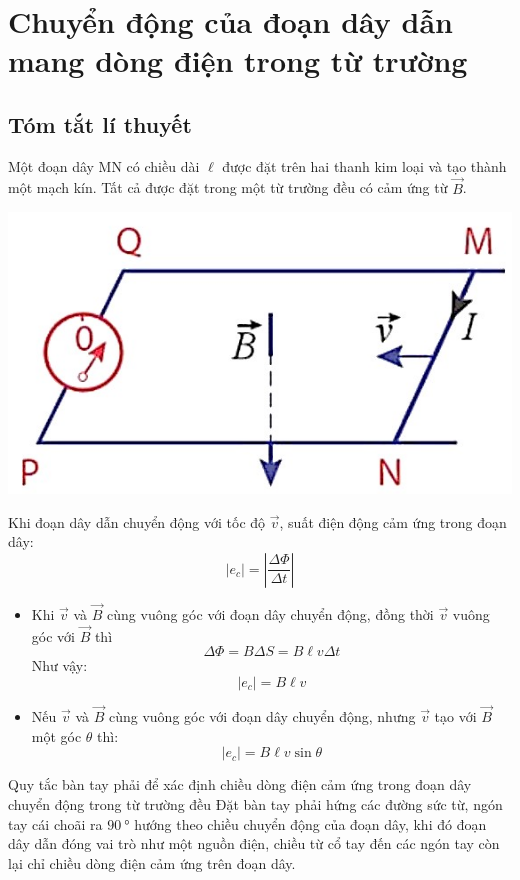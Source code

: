 \section{Chuyển động của đoạn dây dẫn mang dòng điện trong từ trường}
\subsection{Tóm tắt lí thuyết}
\begin{tomtat}
	Một đoạn dây MN có chiều dài $\ell$ được đặt trên hai thanh kim loại và tạo thành một mạch kín. Tất cả được đặt trong một từ trường đều có cảm ứng từ $\vec{B}$.
	\begin{center}
		\includegraphics[width=0.4\linewidth]{figs/VN12-Y24-PH-SYL-022-1}
	\end{center}
	Khi đoạn dây dẫn chuyển động với tốc độ $\vec{v}$, suất điện động cảm ứng trong đoạn dây:
	\begin{equation}
		\left|e_c\right|=\left|\dfrac{\Delta \Phi}{\Delta t}\right|
	\end{equation}
	\begin{itemize}
		\item Khi $\vec{v}$ và $\vec{B}$ cùng vuông góc với đoạn dây chuyển động, đồng thời $\vec{v}$ vuông góc với $\vec{B}$ thì
		$$\Delta \Phi=B\Delta S=B\ell v\Delta t$$
		Như vậy:
		\begin{equation}
			\left|e_c\right|=B\ell v
		\end{equation}
		\item Nếu $\vec{v}$ và $\vec{B}$ cùng vuông góc với đoạn dây chuyển động, nhưng $\vec{v}$ tạo với $\vec{B}$ một góc $\theta$ thì:
		\begin{equation}
			\left|e_c\right|=B\ell v\sin\theta
		\end{equation}
	\end{itemize}
	\begin{noidung}{Quy tắc bàn tay phải để xác định chiều dòng điện cảm ứng trong đoạn dây chuyển động trong từ trường đều}
		Đặt bàn tay phải hứng các đường sức từ, ngón tay cái choãi ra $\SI{90}{\degree}$ hướng theo chiều chuyển động của đoạn dây, khi đó đoạn dây dẫn đóng vai trò như một nguồn điện, chiều từ cổ tay đến các ngón tay còn lại chỉ chiều dòng điện cảm ứng trên đoạn dây.
	\end{noidung}
\end{tomtat}

